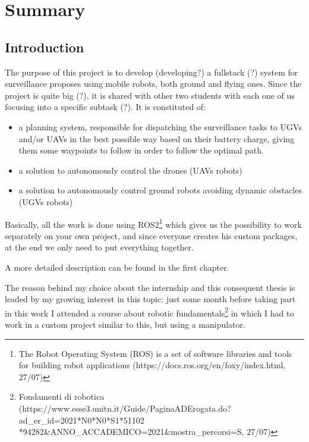 \chapter*{Summary} %
\label{sommario}


\section*{Introduction}

The purpose of this project is to develop (developing?) a fullstack (?) system for surveillance proposes using mobile robots, both ground and flying ones.
Since the project is quite big (?), it is shared with other two students with each one of us focusing into a specific subtask (?). It is constituted of: 

\begin{itemize}
  \item a planning system, responsible for dispatching the surveillance tasks to UGVs and/or UAVs in the best possible way based on their battery charge, giving them some waypoints to follow in order to follow the optimal path.
  \item a solution to autonomously control the drones (UAVs robots)
  \item a solution to autonomously control ground robots avoiding dynamic obstacles (UGVs robots)
\end{itemize}

Basically, all the work is done using ROS2\footnote{The Robot Operating System (ROS) is a set of software libraries and tools for building robot applications (https://docs.ros.org/en/foxy/index.html, 27/07)} which gives us the possibility to work separately on your own project, and since everyone creates his custom packages, at the end we only need to put everything together.

A more detailed description can be found in the first chapter.

The reason behind my choice about the internship and this consequent thesis is leaded by my growing interest in this topic: just some month before taking part in this work I attended a course about robotic fundamentals\footnote{Fondamenti di robotica (https://www.esse3.unitn.it/Guide/PaginaADErogata.do?ad\_er\_id=2021*N0*N0*S1*51102 *94282\&ANNO\_ACCADEMICO=2021\&mostra\_percorsi=S, 27/07)} in which I had to work in a custom project similar to this, but using a manipulator.

